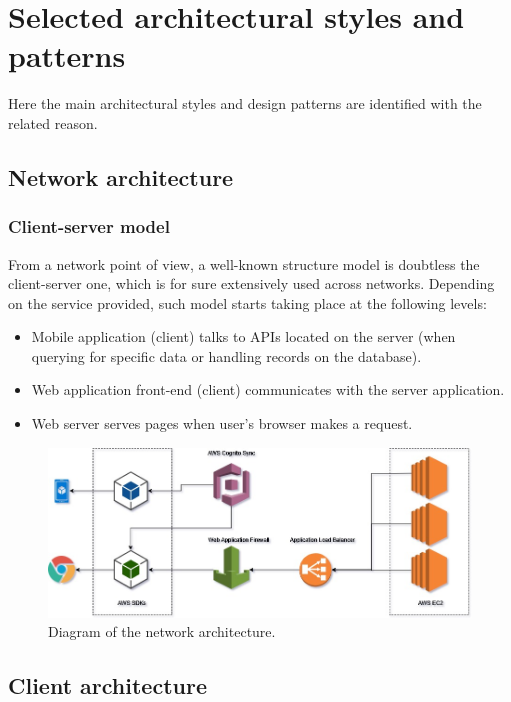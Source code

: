 \section{Selected architectural styles and patterns}
\label{sec:archs}

Here the main architectural styles and design patterns are identified with the related reason.

\subsection*{Network architecture}
\subsubsection*{Client-server model}
From a network point of view, a well-known structure model is doubtless the client-server one, which is for sure extensively used across networks. Depending on the service provided, such model starts taking place at the following levels:
\begin{itemize}
	\item Mobile application (client) talks to APIs located on the server (when querying for specific data or handling records on the database).
	\item Web application front-end (client) communicates with the server application.
	\item Web server serves pages when user's browser makes a request.
\end{itemize}

\begin{figure}
	\centering
	\includegraphics[width=7in]{./diagrams/NetworkDiagram.jpg}
	\caption{Diagram of the network architecture.}
	\label{fig:seqNetworkDiagram}
\end{figure}

\subsection*{Client architecture}
